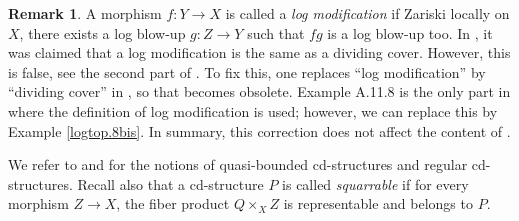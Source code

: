 \documentclass[11pt, a4paper]{amsart}
\theoremstyle{definition}
\newtheorem{rmk}[thm]{Remark}
\numberwithin{equation}{subsection}
\begin{document}
\begin{rmk}
\label{Ori.75}
A morphism $f\colon Y\to X$ is called a \emph{log modification}  if Zariski locally on $X$, 
there exists a log blow-up $g\colon Z\to Y$ such that $fg$ is a log blow-up too.
In \cite[Proposition A.11.9]{logDM}, it was claimed that a log modification is the same as a dividing cover.
However, this is false, see the second part of \cite[Example IV.4.3.4]{Ogu}.
To fix this, 
one replaces ``log modification'' by ``dividing cover'' in \cite{logDM}, 
so that \cite[Proposition A.11.9]{logDM} becomes obsolete.
Example A.11.8 is the only part in \cite{logDM} where the definition of log modification is used;
however, we can replace this by Example \ref{logtop.8bis}.
In summary, 
this correction does not affect the content of \cite{logDM}.
\end{rmk}




We refer to \cite[Definition 3.3.22]{logDM} and \cite[Definition 2.10]{Vcdtop} for the notions of 
quasi-bounded cd-structures and regular cd-structures. Recall also that a cd-structure $P$ is called \emph{squarrable} if for every morphism $Z\to X$, 
the fiber product $Q\times_X Z$ is representable and belongs to $P$.
\end{document}

